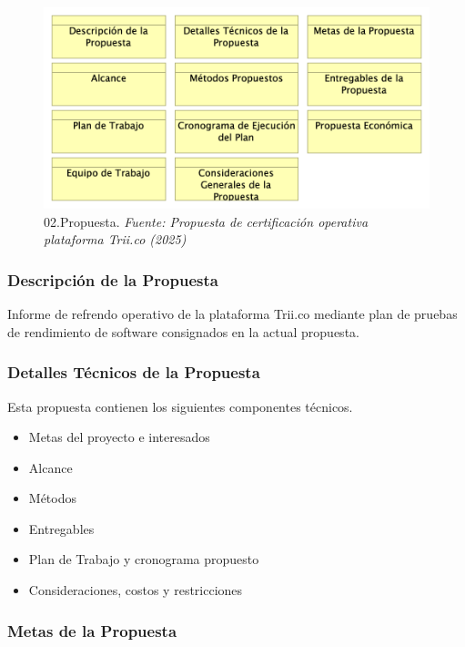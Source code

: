 \documentclass[
  paper=a4,
  ,captions=tableheading
]{scrartcl}
\providecommand{\tightlist}{%
  \setlength{\itemsep}{0pt}\setlength{\parskip}{0pt}}
\begin{document}
\begin{figure}
\centering
\includegraphics[width=5in,height=\textheight]{images/02.Propuesta.png}
\caption{02.Propuesta. \emph{Fuente: Propuesta de certificación
operativa plataforma Trii.co
(2025)}}\label{fig:id-dd2f1c1c1816447380fe900b66faa8bc}
\end{figure}

\subsubsection{Descripción de la
Propuesta}\label{sec:descripciuxf3n-de-la-propuesta}

Informe de refrendo operativo de la plataforma Trii.co mediante plan de
pruebas de rendimiento de software consignados en la actual propuesta.

\subsubsection{Detalles Técnicos de la
Propuesta}\label{sec:detalles-tuxe9cnicos-de-la-propuesta}

Esta propuesta contienen los siguientes componentes técnicos.

\begin{itemize}
\tightlist
\item
  Metas del proyecto e interesados
\item
  Alcance
\item
  Métodos
\item
  Entregables
\item
  Plan de Trabajo y cronograma propuesto
\item
  Consideraciones, costos y restricciones
\end{itemize}

\subsubsection{Metas de la Propuesta}\label{sec:metas-de-la-propuesta}
\end{document}
